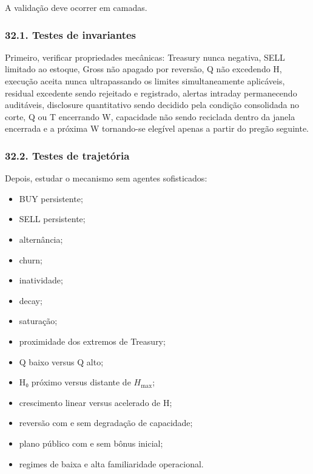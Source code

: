 \documentclass[
  a4paper,
]{article}
\providecommand{\tightlist}{%
  \setlength{\itemsep}{0pt}\setlength{\parskip}{0pt}}
\begin{document}
A validação deve ocorrer em camadas.

\hypertarget{32-1-testes-de-invariantes}{}

\hypertarget{321-testes-de-invariantes}{%
\subsubsection{32.1. Testes de
invariantes}\label{321-testes-de-invariantes}}

Primeiro, verificar propriedades mecânicas: Treasury nunca negativa,
SELL limitado ao estoque, Gross não apagado por reversão, Q não
excedendo H, execução aceita nunca ultrapassando os limites
simultaneamente aplicáveis, residual excedente sendo rejeitado e
registrado, alertas intraday permanecendo auditáveis, disclosure
quantitativo sendo decidido pela condição consolidada no corte, Q ou T
encerrando W, capacidade não sendo reciclada dentro da janela encerrada
e a próxima W tornando-se elegível apenas a partir do pregão seguinte.

\hypertarget{32-2-testes-de-trajetoria}{}

\hypertarget{322-testes-de-trajetuxf3ria}{%
\subsubsection{32.2. Testes de
trajetória}\label{322-testes-de-trajetuxf3ria}}

Depois, estudar o mecanismo sem agentes sofisticados:

\begin{itemize}
\tightlist
\item
  BUY persistente;
\item
  SELL persistente;
\item
  alternância;
\item
  churn;
\item
  inatividade;
\item
  decay;
\item
  saturação;
\item
  proximidade dos extremos de Treasury;
\item
  Q baixo versus Q alto;
\item
  H₀ próximo versus distante de \(H_{\max}\);
\item
  crescimento linear versus acelerado de H;
\item
  reversão com e sem degradação de capacidade;
\item
  plano público com e sem bônus inicial;
\item
  regimes de baixa e alta familiaridade operacional.
\end{itemize}
\end{document}
